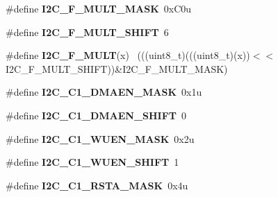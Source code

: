 \begin{DoxyCompactItemize}
\item 
\hypertarget{group___i2_c___register___masks_ga9e077caa9ac07c03f5e34e431d0806fa}{}\#define {\bfseries I2\+C\+\_\+\+F\+\_\+\+M\+U\+L\+T\+\_\+\+M\+A\+S\+K}~0x\+C0u\label{group___i2_c___register___masks_ga9e077caa9ac07c03f5e34e431d0806fa}

\item 
\hypertarget{group___i2_c___register___masks_ga3a338cb3af4c140fde82427d091d5b4a}{}\#define {\bfseries I2\+C\+\_\+\+F\+\_\+\+M\+U\+L\+T\+\_\+\+S\+H\+I\+F\+T}~6\label{group___i2_c___register___masks_ga3a338cb3af4c140fde82427d091d5b4a}

\item 
\hypertarget{group___i2_c___register___masks_ga49d79434c3f1d51dce271f7100559aea}{}\#define {\bfseries I2\+C\+\_\+\+F\+\_\+\+M\+U\+L\+T}(x)                                                    ~(((uint8\+\_\+t)(((uint8\+\_\+t)(x))$<$$<$I2\+C\+\_\+\+F\+\_\+\+M\+U\+L\+T\+\_\+\+S\+H\+I\+F\+T))\&I2\+C\+\_\+\+F\+\_\+\+M\+U\+L\+T\+\_\+\+M\+A\+S\+K)\label{group___i2_c___register___masks_ga49d79434c3f1d51dce271f7100559aea}

\item 
\hypertarget{group___i2_c___register___masks_gadfd8fccdd35a4944a1e53ffa26e5d06b}{}\#define {\bfseries I2\+C\+\_\+\+C1\+\_\+\+D\+M\+A\+E\+N\+\_\+\+M\+A\+S\+K}~0x1u\label{group___i2_c___register___masks_gadfd8fccdd35a4944a1e53ffa26e5d06b}

\item 
\hypertarget{group___i2_c___register___masks_ga1cd5f87cc18a56d293697f0463e2a9e3}{}\#define {\bfseries I2\+C\+\_\+\+C1\+\_\+\+D\+M\+A\+E\+N\+\_\+\+S\+H\+I\+F\+T}~0\label{group___i2_c___register___masks_ga1cd5f87cc18a56d293697f0463e2a9e3}

\item 
\hypertarget{group___i2_c___register___masks_ga708d3eded28946d6f2e4b7ed5aff8fe8}{}\#define {\bfseries I2\+C\+\_\+\+C1\+\_\+\+W\+U\+E\+N\+\_\+\+M\+A\+S\+K}~0x2u\label{group___i2_c___register___masks_ga708d3eded28946d6f2e4b7ed5aff8fe8}

\item 
\hypertarget{group___i2_c___register___masks_gad1bec740751b47fd0f4e02d913c3b287}{}\#define {\bfseries I2\+C\+\_\+\+C1\+\_\+\+W\+U\+E\+N\+\_\+\+S\+H\+I\+F\+T}~1\label{group___i2_c___register___masks_gad1bec740751b47fd0f4e02d913c3b287}

\item 
\hypertarget{group___i2_c___register___masks_ga656f6747e8edc8299767365ea1ac9d70}{}\#define {\bfseries I2\+C\+\_\+\+C1\+\_\+\+R\+S\+T\+A\+\_\+\+M\+A\+S\+K}~0x4u\label{group___i2_c___register___masks_ga656f6747e8edc8299767365ea1ac9d70}


\end{DoxyCompactItemize}
